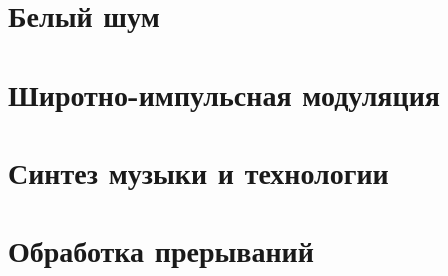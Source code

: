 \documentclass[a4paper,twoside]{book}
\begin{document}
\chapter{Белый шум}







\chapter{Широтно-импульсная модуляция}
\label{chapter:pwm}






\chapter{Синтез музыки и технологии}


















\chapter{Обработка прерываний}

\end{document}
